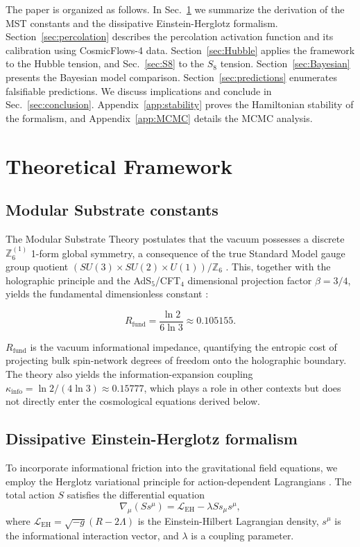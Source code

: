 \documentclass[12pt,a4paper]{article}
\theoremstyle{plain}
\theoremstyle{definition}
\theoremstyle{remark}
\begin{document}
The paper is organized as follows. In Sec.~\ref{sec:theory} we summarize the derivation of the MST constants and the dissipative Einstein-Herglotz formalism. Section~\ref{sec:percolation} describes the percolation activation function and its calibration using CosmicFlows-4 data. Section~\ref{sec:Hubble} applies the framework to the Hubble tension, and Sec.~\ref{sec:S8} to the \(S_8\) tension. Section~\ref{sec:Bayesian} presents the Bayesian model comparison. Section~\ref{sec:predictions} enumerates falsifiable predictions. We discuss implications and conclude in Sec.~\ref{sec:conclusion}. Appendix~\ref{app:stability} proves the Hamiltonian stability of the formalism, and Appendix~\ref{app:MCMC} details the MCMC analysis.

\section{Theoretical Framework}
\label{sec:theory}

\subsection{Modular Substrate constants}
The Modular Substrate Theory postulates that the vacuum possesses a discrete \(\mathbb{Z}_6^{(1)}\) 1-form global symmetry, a consequence of the true Standard Model gauge group quotient \((SU(3)\times SU(2)\times U(1))/\mathbb{Z}_6\) \cite{aharony2013}. This, together with the holographic principle and the AdS\(_5\)/CFT\(_4\) dimensional projection factor \(\beta=3/4\), yields the fundamental dimensionless constant \cite{MSTfound}:

\begin{equation}
R_{\text{fund}} = \frac{\ln 2}{6\ln 3} \approx 0.105155.
\label{eq:Rfund}
\end{equation}

\(R_{\text{fund}}\) is the vacuum informational impedance, quantifying the entropic cost of projecting bulk spin-network degrees of freedom onto the holographic boundary. The theory also yields the information-expansion coupling \(\kappa_{\text{info}} = \ln 2/(4\ln 3) \approx 0.15777\), which plays a role in other contexts but does not directly enter the cosmological equations derived below.

\subsection{Dissipative Einstein-Herglotz formalism}
To incorporate informational friction into the gravitational field equations, we employ the Herglotz variational principle for action-dependent Lagrangians \cite{Herglotz1930, Lazo2017}. The total action \(S\) satisfies the differential equation
\begin{equation}
\nabla_\mu (S s^\mu) = \mathcal{L}_{\text{EH}} - \lambda S s_\mu s^\mu,
\label{eq:Herglotz}
\end{equation}
where \(\mathcal{L}_{\text{EH}} = \sqrt{-g}(R-2\Lambda)\) is the Einstein-Hilbert Lagrangian density, \(s^\mu\) is the informational interaction vector, and \(\lambda\) is a coupling parameter.
\end{document}
